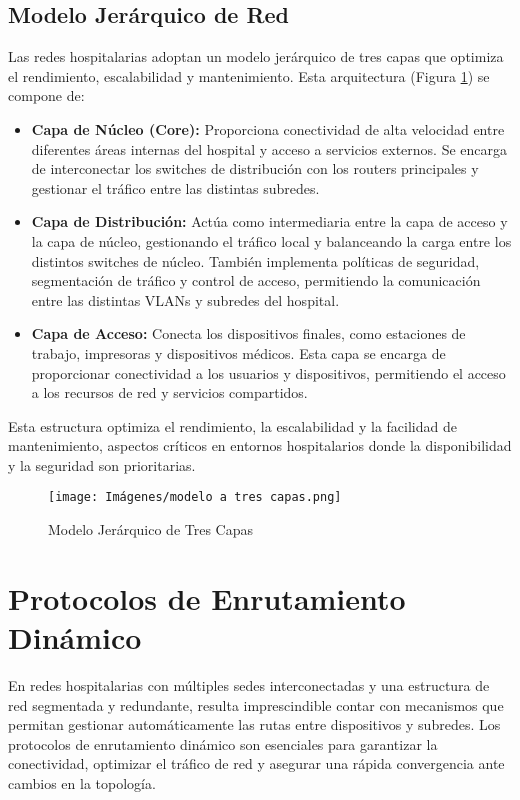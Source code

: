 \subsection{Modelo Jerárquico de Red}
Las redes hospitalarias adoptan un modelo jerárquico de tres capas que optimiza el rendimiento, escalabilidad y mantenimiento. Esta arquitectura (Figura \ref{fig:3capas}) se compone de:
\begin{itemize}
    \item \textbf{Capa de Núcleo (Core):} Proporciona conectividad de alta velocidad entre diferentes áreas internas del hospital y acceso a servicios externos. Se encarga de 
    interconectar los switches de distribución con los routers principales y gestionar el tráfico entre las distintas subredes.
    \item \textbf{Capa de Distribución:} Actúa como intermediaria entre la capa de acceso y la capa de núcleo, gestionando el tráfico local y balanceando la carga
    entre los distintos switches de núcleo. También implementa políticas de seguridad, segmentación de tráfico y control de acceso, permitiendo la comunicación entre las distintas 
    VLANs y subredes del hospital.
    \item \textbf{Capa de Acceso:} Conecta los dispositivos finales, como estaciones de trabajo, impresoras y dispositivos médicos. Esta capa se encarga de proporcionar
    conectividad a los usuarios y dispositivos, permitiendo el acceso a los recursos de red y servicios compartidos. 
\end{itemize}
Esta estructura optimiza el rendimiento, la escalabilidad y la facilidad de mantenimiento, aspectos críticos en entornos hospitalarios donde la disponibilidad y la seguridad son prioritarias.
\begin{figure}[H]
    \centering
    \texttt{[image: Imágenes/modelo a tres capas.png]}
    \caption{Modelo Jerárquico de Tres Capas}
    \label{fig:3capas}
\end{figure}

\section{Protocolos de Enrutamiento Dinámico}
En redes hospitalarias con múltiples sedes interconectadas y una estructura de red segmentada y redundante, resulta imprescindible contar con mecanismos que permitan 
gestionar automáticamente las rutas entre dispositivos y subredes. Los protocolos de enrutamiento dinámico son esenciales para garantizar la conectividad, optimizar el 
tráfico de red y asegurar una rápida convergencia ante cambios en la topología.


